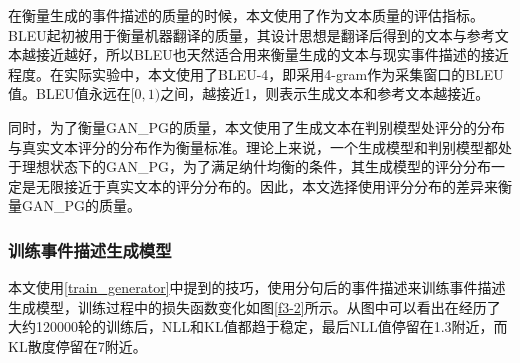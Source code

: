 在衡量生成的事件描述的质量的时候，本文使用了作为文本质量的评估指标。BLEU起初被用于衡量机器翻译的质量，其设计思想是翻译后得到的文本与参考文本越接近越好，所以BLEU也天然适合用来衡量生成的文本与现实事件描述的接近程度。在实际实验中，本文使用了BLEU-4，即采用4-gram作为采集窗口的BLEU值。BLEU值永远在$[0,1)$之间，越接近1，则表示生成文本和参考文本越接近。

同时，为了衡量GAN\_PG的质量，本文使用了生成文本在判别模型处评分的分布与真实文本评分的分布作为衡量标准。理论上来说，一个生成模型和判别模型都处于理想状态下的GAN\_PG，为了满足纳什均衡的条件，其生成模型的评分分布一定是无限接近于真实文本的评分分布的。因此，本文选择使用评分分布的差异来衡量GAN\_PG的质量。

\subsubsection{训练事件描述生成模型}
本文使用\ref{train_generator}中提到的技巧，使用分句后的事件描述来训练事件描述生成模型，训练过程中的损失函数变化如图\ref{f3-2}所示。从图中可以看出在经历了大约120000轮的训练后，NLL和KL值都趋于稳定，最后NLL值停留在1.3附近，而KL散度停留在7附近。
